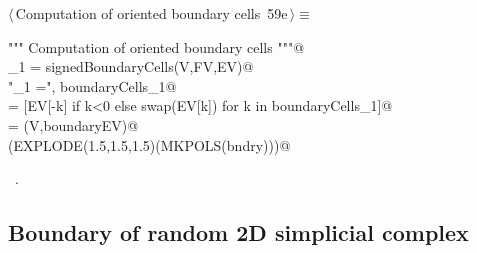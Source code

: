\documentclass[11pt,oneside]{article}    %
\begin{document}
\begin{flushleft} \small \label{scrap112}
\protect{}$\langle\,$Computation of oriented boundary cells\nobreak\ {\footnotesize 59e}$\,\rangle\equiv$
\vspace{-1ex}
\begin{list}{}{} \item
\mbox{}\verb@"""  Computation of oriented boundary cells """@\\
\mbox{}\verb@boundaryCells_1 = signedBoundaryCells(V,FV,EV)@\\
\mbox{}\verb@print "\nboundaryCells_1 =\n", boundaryCells_1@\\
\mbox{}\verb@boundaryEV = [EV[-k] if k<0 else swap(EV[k]) for k in boundaryCells_1]@\\
\mbox{}\verb@bndry = (V,boundaryEV)@\\
\mbox{}\verb@VIEW(EXPLODE(1.5,1.5,1.5)(MKPOLS(bndry)))@\\
\mbox{}\verb@@{\NWsep}
\end{list}
\vspace{-1ex}
\footnotesize\addtolength{\baselineskip}{-1ex}
\begin{list}{}{\setlength{\itemsep}{-\parsep}\setlength{\itemindent}{-\leftmargin}}
\item \NWtxtMacroRefIn\ .
\end{list}
\end{flushleft}

\subsection{Boundary of random 2D simplicial complex}
\end{document}
